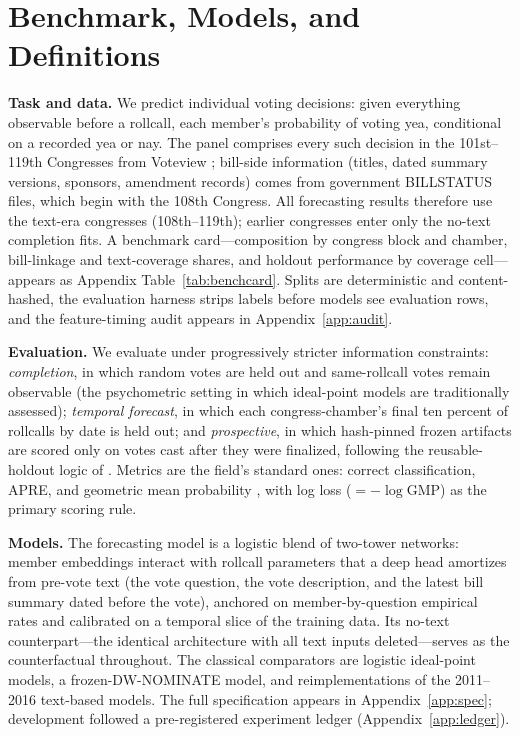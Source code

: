 \documentclass[12pt]{article}
\begin{document}
\section{Benchmark, Models, and Definitions}
\label{sec:setup}

\textbf{Task and data.} We predict individual voting decisions: given
everything observable before a rollcall, each member's probability of
voting yea, conditional on a recorded yea or nay. The panel comprises
every such decision in the 101st--119th Congresses from Voteview
\citep{lewis2026voteview}; bill-side information (titles, dated
summary versions, sponsors, amendment records) comes from government
BILLSTATUS files, which begin with the 108th Congress. All
forecasting results therefore use the text-era congresses
(108th--119th); earlier congresses enter only the no-text completion
fits. A benchmark card---composition by congress block and chamber,
bill-linkage and text-coverage shares, and holdout performance by
coverage cell---appears as Appendix Table~\ref{tab:benchcard}. Splits
are deterministic and content-hashed, the evaluation harness strips
labels before models see evaluation rows, and the feature-timing
audit appears in Appendix~\ref{app:audit}.

\textbf{Evaluation.} We evaluate under progressively stricter
information constraints: \emph{completion}, in which random votes are
held out and same-rollcall votes remain observable (the psychometric
setting in which ideal-point models are traditionally assessed);
\emph{temporal forecast}, in which each congress-chamber's final ten
percent of rollcalls by date is held out; and \emph{prospective}, in
which hash-pinned frozen artifacts are scored only on votes cast
after they were finalized, following the reusable-holdout logic of
\citet{dwork2015holdout}. Metrics are the field's standard ones:
correct classification, APRE, and geometric mean probability
\citep{carroll2013structure}, with log loss ($= -\log \mathrm{GMP}$)
as the primary scoring rule.

\textbf{Models.} The forecasting model is a logistic blend of
two-tower networks: member embeddings interact with rollcall
parameters that a deep head amortizes from pre-vote text (the vote
question, the vote description, and the latest bill summary dated
before the vote), anchored on member-by-question empirical rates and
calibrated on a temporal slice of the training data. Its no-text
counterpart---the identical architecture with all text inputs
deleted---serves as the counterfactual throughout. The classical
comparators are logistic ideal-point models, a frozen-DW-NOMINATE
model, and reimplementations of the 2011--2016 text-based models.
The full specification appears in Appendix~\ref{app:spec};
development followed a pre-registered experiment ledger
(Appendix~\ref{app:ledger}).
\end{document}
